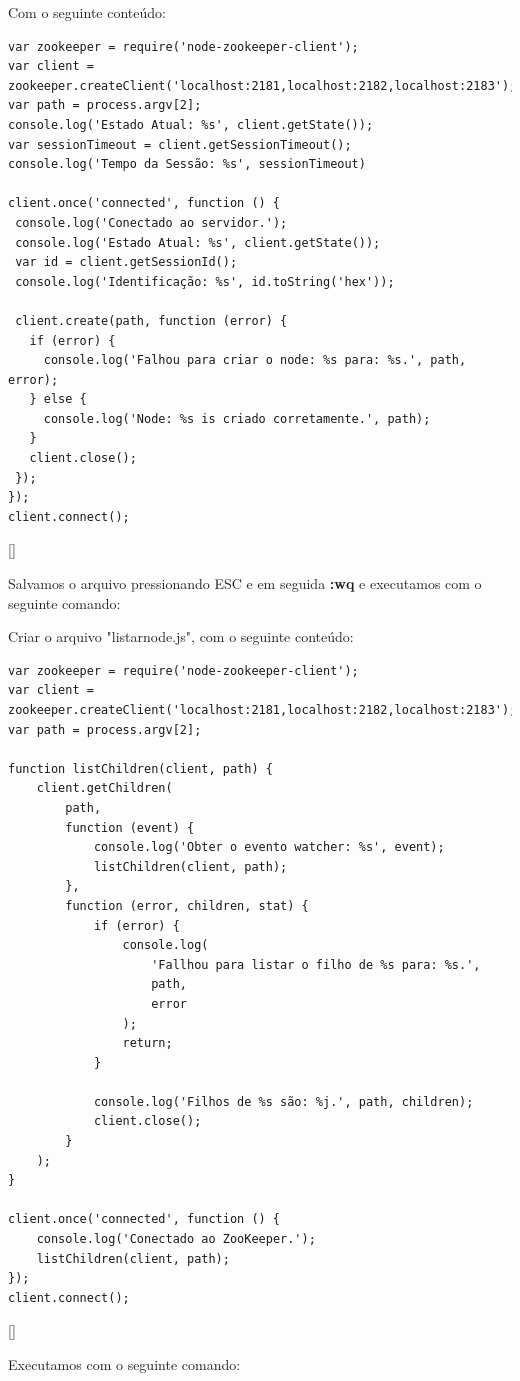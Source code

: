 \documentclass[a4paper,11pt]{article}
\begin{document}
Com o seguinte conteúdo:
\begin{lstlisting}[]
var zookeeper = require('node-zookeeper-client');
var client = zookeeper.createClient('localhost:2181,localhost:2182,localhost:2183');
var path = process.argv[2];
console.log('Estado Atual: %s', client.getState());
var sessionTimeout = client.getSessionTimeout();
console.log('Tempo da Sessão: %s', sessionTimeout)

client.once('connected', function () {
 console.log('Conectado ao servidor.');
 console.log('Estado Atual: %s', client.getState());
 var id = client.getSessionId();
 console.log('Identificação: %s', id.toString('hex'));

 client.create(path, function (error) {
   if (error) {
     console.log('Falhou para criar o node: %s para: %s.', path, error);
   } else {
     console.log('Node: %s is criado corretamente.', path);
   }
   client.close();
 });
});
client.connect();
\end{lstlisting}[]

Salvamos o arquivo pressionando ESC e em seguida \textbf{:wq} e executamos com o seguinte comando: \\

Criar o arquivo "listarnode.js", com o seguinte conteúdo:
\begin{lstlisting}[]
var zookeeper = require('node-zookeeper-client');
var client = zookeeper.createClient('localhost:2181,localhost:2182,localhost:2183');
var path = process.argv[2];

function listChildren(client, path) {
    client.getChildren(
        path,
        function (event) {
            console.log('Obter o evento watcher: %s', event);
            listChildren(client, path);
        },
        function (error, children, stat) {
            if (error) {
                console.log(
                    'Fallhou para listar o filho de %s para: %s.',
                    path,
                    error
                );
                return;
            }

            console.log('Filhos de %s são: %j.', path, children);
            client.close();
        }
    );
}

client.once('connected', function () {
    console.log('Conectado ao ZooKeeper.');
    listChildren(client, path);
});
client.connect();
\end{lstlisting}[]

Executamos com o seguinte comando: \\
\end{document}
